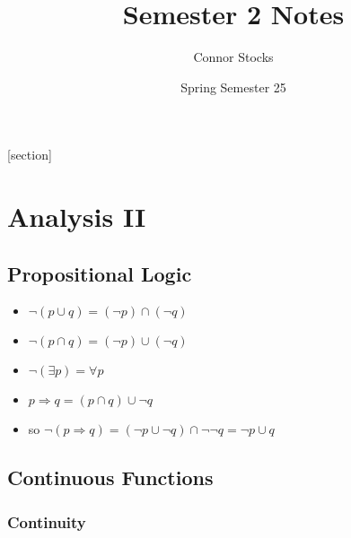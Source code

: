 \documentclass{article}
\title{Semester 2 Notes}
\author{Connor Stocks}
\date{Spring Semester 25}
\begin{document}
[section]
\newcommand{\equationref}{\stepcounter{eq}\arabic{section}.\arabic{eq}}
\newcommand{\tagequation}[1]{\[\tag{\equationref}#1\]}
\newcommand{\colour}[1]{\color{#1}}
\newcommand{\textcolour}[2]{\textcolour{#1}{#2}}

\hypersetup{
    colorlinks,
    citecolor=black,
    filecolor=black,
    linkcolor=black,
    urlcolor=black
}


\maketitle

\newpage
\tableofcontents


\newpage
\section{Analysis II}
\subsection{Propositional Logic}




\begin{itemize}
    \item \(\lnot(p\cup q) = (\lnot p)\cap(\lnot q)\)
    \item \(\lnot(p\cap q) = (\lnot p)\cup(\lnot q)\)
    \item \(\lnot(\exists p) = \forall p\)
    \item \(p \Rightarrow q = (p\cap q)\cup \lnot q\)
    \item so \(\lnot (p\Rightarrow q) = (\lnot p \cup\lnot q)\cap \lnot\lnot q = \lnot p\cup q\)
\end{itemize}

\subsection{Continuous Functions}

\subsubsection*{Continuity}
\end{document}
